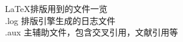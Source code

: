 \documentclass{ctexart}
\begin{document}
{\large \LaTeX 排版用到的文件一览}\\
.log 排版引擎生成的日志文件\\
.aux 主辅助文件，包含交叉引用，文献引用等\\
\end{document}
